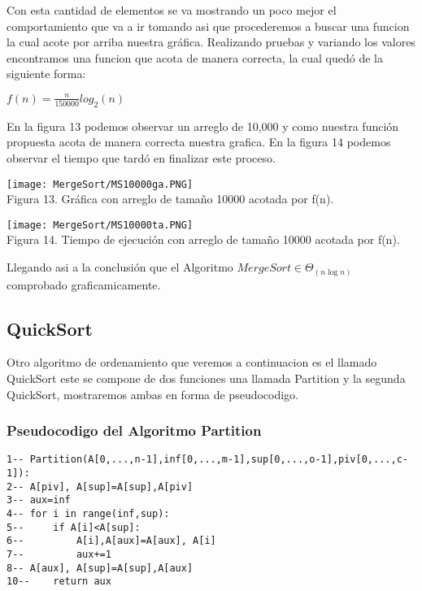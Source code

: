\documentclass[12pt,twoside]{article}
\begin{document}
Con esta cantidad de elementos se va mostrando un poco mejor el comportamiento que va a ir tomando asi que procederemos a buscar una funcion la cual acote por arriba nuestra gr\'afica.
Realizando pruebas y variando los valores encontramos una funcion que acota de manera correcta, la cual qued\'o de la siguiente forma:
\begin{center}
    $f(n) = \frac{n}{150000}log_2(n)$
\end{center}
En la figura 13 podemos observar un arreglo de 10,000 y como nuestra funci\'on propuesta acota de manera correcta nuestra grafica. En la figura 14 podemos observar el tiempo que tard\'o en finalizar este proceso.
\begin{center}
    \texttt{[image: MergeSort/MS10000ga.PNG]}\\
    Figura 13. Gr\'afica con arreglo de tamaño 10000 acotada por f(n).
\end{center}
\begin{center}
    \texttt{[image: MergeSort/MS10000ta.PNG]}\\
    Figura 14. Tiempo de ejecuci\'on con arreglo de tamaño 10000 acotada por f(n).
\end{center}
Llegando asi a la conclusi\'on que el Algoritmo $ Merge Sort\in \Theta_{(n \log n)}$\\
comprobado graficamicamente.
\subsection{QuickSort}
Otro algoritmo de ordenamiento que veremos a continuacion es el llamado QuickSort este se compone de dos funciones una llamada Partition y la segunda QuickSort, mostraremos ambas en forma de pseudocodigo.
\subsubsection{Pseudocodigo del Algoritmo Partition}
\begin{lstlisting}
1-- Partition(A[0,...,n-1],inf[0,...,m-1],sup[0,...,o-1],piv[0,...,c-1]):
2--	A[piv], A[sup]=A[sup],A[piv]
3--	aux=inf
4--	for i in range(inf,sup):
5--		if A[i]<A[sup]:
6--			A[i],A[aux]=A[aux], A[i]
7--			aux+=1
8--	A[aux], A[sup]=A[sup],A[aux]
10--	return aux
\end{lstlisting}
\end{document}
